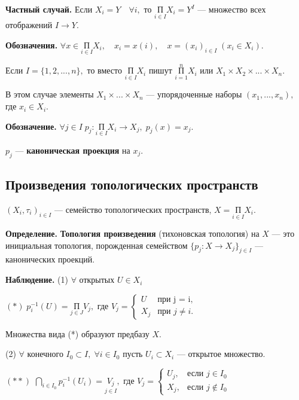 \documentclass[12pt,a4paper]{article}
\begin{document}
\textbf{Частный случай.} Если $X_{i} = Y \quad \forall i,$ то $\underset{i \in I}{\text{П}} X_{i} = Y^{I}$ --- множество всех отображений $I \to Y.$

\textbf{Обозначения.} $\forall x \in \underset{i \in I}{\text{П}} X_{i}, \quad x_{i} = x(i), \quad x = (x_{i})_{i \in I} \; (x_{i} \in X_{i}).$ 

Если $I = \{1, 2, ..., n\},$ то вместо $\underset{i \in I}{\text{П}}X_{i}$ пишут $\overset{n}{\underset{i = 1}{\text{П}}}X_{i}$ или $X_{1} \times X_{2} \times ... \times X_{n}.$ 

В этом случае элементы $X_{1} \times ... \times X_{n}$ --- упорядоченные наборы $(x_{1}, ..., x_{n}),$ где $x_{i} \in X_{i}.$ 

\textbf{Обозначение.} $\forall j \in I \; p_{j}: \underset{i \in I}{\text{П}} X_{i} \to X_{j}, \; p_{j}(x) = x_{j}.$ 

$p_{j}$ --- \textbf{каноническая проекция} на $x_{j}.$ 

\subsection{Произведения топологических пространств} 

$(X_{i}, \tau_{i})_{i \in I}$ --- семейство топологических пространств, $X = \underset{i \in I}{\text{П}} X_{i}.$ 

\textbf{Определение.} \textbf{Топология произведения} (тихоновская топология) на $X$ --- это инициальная топология, порожденная семейством $\{p_{j}: X \to X_{j}\}_{j \in I}$ --- канонических проекций.
	
\textbf{Наблюдение.} (1) $\forall$ открытых $U \in X_{i}$ 

$(*) \; p_{i}^{-1}(U) = \underset{j \in J}{\text{П}} V_{j},$ где $V_{j} = 
\begin{cases}
U &\text{при j = i,}\\
X_{j} &\text{при $j \neq i.$}
\end{cases}$

Множества вида (*) образуют предбазу $X.$ 

(2) $\forall$ конечного $I_{0} \subset I, \; \forall i \in I_{0}$ пусть $U_{i} \subset X_{i}$ --- открытое множество. 

$(**)$ $\underset{i \in I_{0}}{\bigcap} p_{i}^{-1}(U_{i}) = \underset{j \in I}{V_{j}},$ где $V_{j} = 
\begin{cases}
U_{j}, &\text{если $j \in I_{0}$}\\
X_{j}, &\text{если $j \not \in I_{0}$}
\end{cases}$
\end{document}
